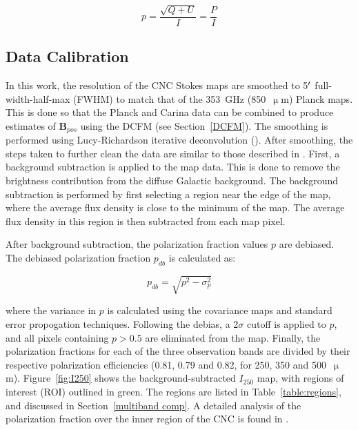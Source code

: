 \begin{equation}\label{pol frac}
  p = \frac{\sqrt{Q + U}}{I} = \frac{P}{I}
\end{equation}

\subsection{Data Calibration}\label{data_cal}

In this work, the resolution of the CNC Stokes maps are smoothed to 5$\operatorname{^{\prime}}$ full-width-half-max (FWHM) to match that of the 353~GHz (850~$\upmu$m) Planck maps. This is done so that the Planck and Carina data can be combined to produce estimates of $\boldsymbol{B}_{pos}$ using the DCFM (see Section~\ref{DCFM}). The smoothing is performed using Lucy-Richardson iterative deconvolution (\citet{lucy1974iterative,richardson1972bayesian}). After smoothing, the steps taken to further clean the data are similar to those described in \citet{shariff2015polarimetry}. First, a background subtraction is applied to the map data. This is done to remove the brightness contribution from the diffuse Galactic background. The background subtraction is performed by first selecting a region near the edge of the map, where the average flux density is close to the minimum of the map. The average flux density in this region is then subtracted from each map pixel.

After background subtraction, the polarization fraction values $p$ are debiased. The debiased polarization fraction $p_{db}$ is calculated as:

\begin{equation}
  p_{db} = \sqrt{p^{2} - \sigma_{p}^{2}}
\end{equation}

where the variance in $p$ is calculated using the covariance maps and standard error propogation techniques. Following the debias, a 2$\sigma$ cutoff is applied to $p$, and all pixels containing $p > 0.5$ are eliminated from the map. Finally, the polarization fractions for each of the three observation bands are divided by their respective polarization efficiencies (0.81, 0.79 and 0.82, for 250, 350 and 500~$\upmu$m). Figure~\ref{fig:I250} shows the background-subtracted $I_{250}$ map, with regions of interest (ROI) outlined in green. The regions are listed in Table~\ref{table:regions}, and discussed in Section~\ref{multiband comp}. A detailed analysis of the polarization fraction over the inner region of the CNC is found in \citet{shariff2019submillimeter}.

